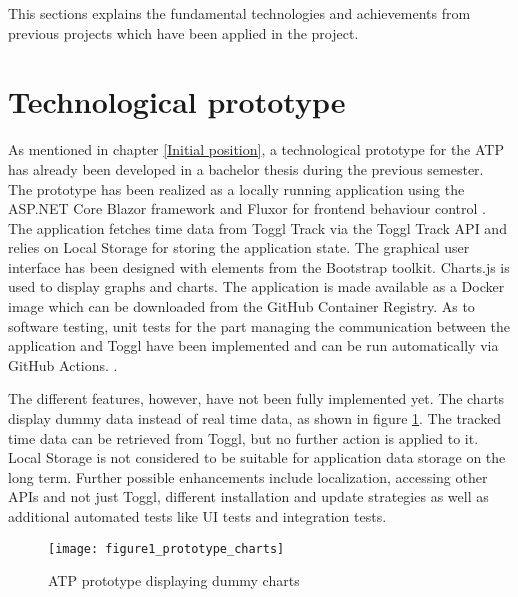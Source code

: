 
This sections explains the fundamental technologies and achievements from previous projects which have been applied in the project.

\section{Technological prototype} \label{Prototype}
As mentioned in chapter \ref{Initial position}, a technological prototype for the ATP has already been developed in a bachelor thesis during the previous semester. The prototype has been realized as a locally running application using the ASP.NET Core Blazor framework and Fluxor for frontend behaviour control \cite{bachelorarbeit_Egger_Verstappen_page4-7}. The application fetches time data from Toggl Track via the Toggl Track API and relies on Local Storage for storing the application state. The graphical user interface has been designed with elements from the Bootstrap toolkit. Charts.js is used to display graphs and charts. The application is made available as a Docker image which can be downloaded from the GitHub Container Registry. As to software testing, unit tests for the part managing the communication between the application and Toggl have been implemented and can be run automatically via GitHub Actions. \cite{bachelorarbeit_Egger_Verstappen_page23-25}.

The different features, however, have not been fully implemented yet. The charts display dummy data instead of real time data, as shown in figure \ref{figure1}. The tracked time data can be retrieved from Toggl, but no further action is applied to it. Local Storage is not considered to be suitable for application data storage on the long term. Further possible enhancements include localization, accessing other APIs and not just Toggl, different installation and update strategies as well as additional automated tests like UI tests and integration tests. \cite{bachelorarbeit_Egger_Verstappen_page26-27}

\begin{figure}[H]
\centering
\texttt{[image: figure1\_prototype\_charts]}
\caption{ATP prototype displaying dummy charts}
\label{figure1}
\end{figure}

